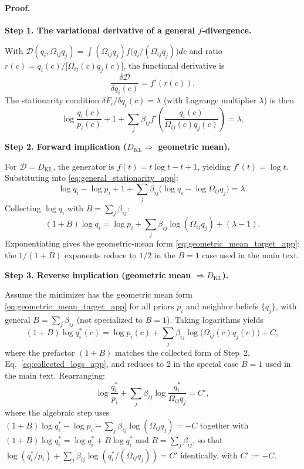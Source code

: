 \documentclass[11pt]{article}
\begin{document}
\paragraph{Proof.}

\textbf{Step 1. The variational derivative of a general $f$-divergence.}

With $\mathcal{D}(q_i,\Omega_{ij}q_j)=\int (\Omega_{ij}q_j)f\bigl(q_i/(\Omega_{ij}q_j)\bigr)dc$ and ratio $r(c)=q_i(c)/\bigl[\Omega_{ij}(c)q_j(c)\bigr]$, the functional derivative is
\begin{equation}
\frac{\delta\mathcal{D}}{\delta q_i(c)} = f'(r(c)).
\end{equation}
The stationarity condition $\delta F_i/\delta q_i(c)=\lambda$ (with Lagrange multiplier $\lambda$) is then
\begin{equation}
\log\frac{q_i(c)}{p_i(c)} + 1
+ \sum_j \beta_{ij}f'\left(\frac{q_i(c)}{\Omega_{ij}(c)q_j(c)}\right) = \lambda.
\label{eq:general_stationarity_app}
\end{equation}

\textbf{Step 2. Forward implication ($D_{\mathrm{KL}}\Rightarrow$ geometric mean).}

For $\mathcal{D}=D_{\mathrm{KL}}$, the generator is $f(t)=t\log t - t + 1$, yielding $f'(t)=\log t$. Substituting into \eqref{eq:general_stationarity_app}:
\[
\log q_i - \log p_i + 1 + \sum_j \beta_{ij}\bigl(\log q_i - \log\Omega_{ij}q_j\bigr) = \lambda.
\]
Collecting $\log q_i$ with $B = \sum_j \beta_{ij}$:
\begin{equation}
(1+B)\log q_i = \log p_i + \sum_j\beta_{ij}\log(\Omega_{ij}q_j) + (\lambda - 1).
\label{eq:collected_logs_app}
\end{equation}
Exponentiating gives the geometric-mean form \eqref{eq:geometric_mean_target_app}; the $1/(1+B)$ exponents reduce to $1/2$ in the $B = 1$ case used in the main text.

\textbf{Step 3. Reverse implication (geometric mean $\Rightarrow D_{\mathrm{KL}}$).}

Assume the minimizer has the geometric mean form \eqref{eq:geometric_mean_target_app} for all priors $p_i$ and neighbor beliefs $\{q_j\}$, with general $B = \sum_j \beta_{ij}$ (not specialized to $B = 1$). Taking logarithms yields
\begin{equation}
(1+B)\log q_i^*(c) = \log p_i(c) + \sum_j\beta_{ij}\log\bigl(\Omega_{ij}(c)q_j(c)\bigr) + C,
\end{equation}
where the prefactor $(1+B)$ matches the collected form of Step~2, Eq.~\eqref{eq:collected_logs_app}, and reduces to $2$ in the special case $B = 1$ used in the main text. Rearranging:
\begin{equation}
\log\frac{q_i^*}{p_i} + \sum_j\beta_{ij}\log\frac{q_i^*}{\Omega_{ij}q_j} = C',
\label{eq:rearranged_target_app}
\end{equation}
where the algebraic step uses $(1+B)\log q_i^* - \log p_i - \sum_j\beta_{ij}\log(\Omega_{ij}q_j) = -C$ together with $(1+B)\log q_i^* = \log q_i^* + B\log q_i^*$ and $B = \sum_j\beta_{ij}$, so that $\log(q_i^*/p_i) + \sum_j\beta_{ij}\log(q_i^*/(\Omega_{ij}q_j)) = C'$ identically, with $C' := -C$.
\end{document}

